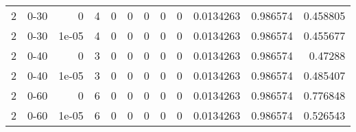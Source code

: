 \begin{tabular}{rlrrrrrrrrrr}
     2 & 0-30   &      0     &           4 &                 0 &                 0 &               0 &     0           &                0 &        0.0134263 &               0.986574 &           0.458805 \\
     2 & 0-30   &      1e-05 &           4 &                 0 &                 0 &               0 &     0           &                0 &        0.0134263 &               0.986574 &           0.455677 \\
     2 & 0-40   &      0     &           3 &                 0 &                 0 &               0 &     0           &                0 &        0.0134263 &               0.986574 &           0.47288  \\
     2 & 0-40   &      1e-05 &           3 &                 0 &                 0 &               0 &     0           &                0 &        0.0134263 &               0.986574 &           0.485407 \\
     2 & 0-60   &      0     &           6 &                 0 &                 0 &               0 &     0           &                0 &        0.0134263 &               0.986574 &           0.776848 \\
     2 & 0-60   &      1e-05 &           6 &                 0 &                 0 &               0 &     0           &                0 &        0.0134263 &               0.986574 &           0.526543 \\
\hline
\end{tabular}
